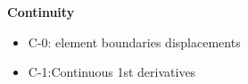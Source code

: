 \documentclass[landscape,a0paper,fontscale=0.285]{baposter} %
\newcommand{\compresslist}{ %
\setlength{\itemsep}{1pt}
\setlength{\parskip}{0pt}
\setlength{\parsep}{0pt}
}
\begin{document}
\begin{poster}
{%










\textbf{Continuity}
\vspace{-0.3cm}
\begin{itemize}\compresslist
    \item C-0: element boundaries displacements
    \item C-1:Continuous 1st derivatives
\end{itemize}
\vspace{-0.3cm}

}
\end{poster}
\end{document}
